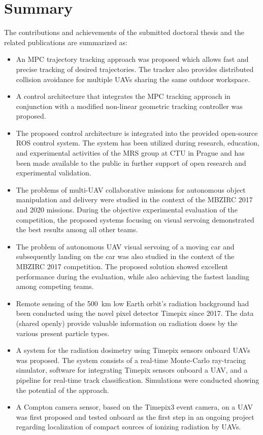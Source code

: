 \documentclass[a4paper,11pt,twoside,openright]{book}
\begin{document}
\section{Summary}

The contributions and achievements of the submitted doctoral thesis and the related publications are summarized as:
\begin{itemize}
  \item An MPC trajectory tracking approach was proposed which allows fast and precise tracking of desired trajectories. The tracker also provides distributed collision avoidance for multiple \acp{UAV} sharing the same outdoor workspace.
  \item A control architecture that integrates the MPC tracking approach in conjunction with a modified non-linear geometric tracking controller was proposed.
  \item The proposed control architecture is integrated into the provided open-source \ac{ROS} control system. The system has been utilized during research, education, and experimental activities of the \ac{MRS} group at \ac{CTU} in Prague and has been made available to the public in further support of open research and experimental validation.
  \item The problems of multi-\ac{UAV} collaborative missions for autonomous object manipulation and delivery were studied in the context of the MBZIRC 2017 and 2020 missions. During the objective experimental evaluation of the competition, the proposed systems focusing on visual servoing demonstrated the best results among all other teams.
  \item The problem of autonomous \ac{UAV} visual servoing of a moving car and subsequently landing on the car was also studied in the context of the MBZIRC 2017 competition. The proposed solution showed excellent performance during the evaluation, while also achieving the fastest landing among competing teams.
  \item Remote sensing of the \SI{500}{km} low Earth orbit's radiation background had been conducted using the novel pixel detector Timepix since 2017. The data (shared openly) provide valuable information on radiation doses by the various present particle types.
  \item A system for the radiation dosimetry using Timepix sensors onboard \acp{UAV} was proposed. The system consists of a real-time Monte-Carlo ray-tracing simulator, software for integrating Timepix sensors onboard a \ac{UAV}, and a pipeline for real-time track classification. Simulations were conducted showing the potential of the approach.
  \item A Compton camera sensor, based on the Timepix3 event camera, on a \ac{UAV} was first proposed and tested onboard as the first step in an ongoing project regarding localization of compact sources of ionizing radiation by \acp{UAV}.
\end{itemize}
\end{document}
